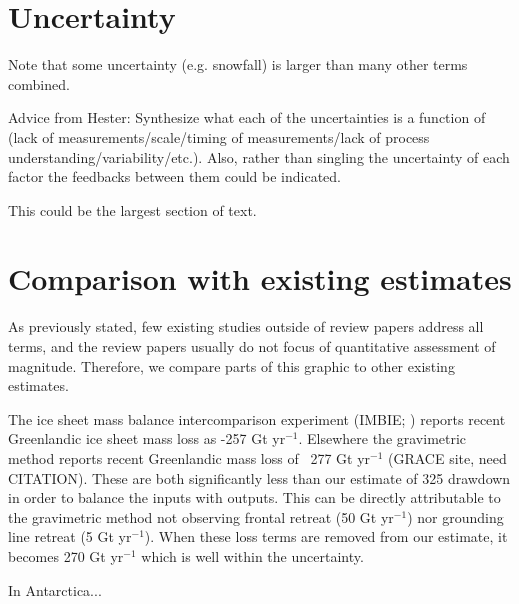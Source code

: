 \documentclass[jog]{igs}
\begin{document}
\section{Uncertainty}

Note that some uncertainty (e.g. snowfall) is larger than many other terms combined.

Advice from Hester: Synthesize what each of the uncertainties is a function of (lack of measurements/scale/timing of measurements/lack of process understanding/variability/etc.). Also, rather than singling the uncertainty of each factor the feedbacks between them could be indicated.

This could be the largest section of text.

\section{Comparison with existing estimates}

As previously stated, few existing studies outside of review papers address all terms, and the review papers usually do not focus of quantitative assessment of magnitude. Therefore, we compare parts of this graphic to other existing estimates.

The ice sheet mass balance intercomparison experiment (IMBIE; \citet{otosaka_2023}) reports recent Greenlandic ice sheet mass loss as -257  Gt yr$^{-1}$. Elsewhere the gravimetric method reports recent Greenlandic mass loss of ~277 Gt yr$^{-1}$ (GRACE site, need CITATION). These are both significantly less than our estimate of 325 drawdown in order to balance the inputs with outputs. This can be directly attributable to the gravimetric method not observing frontal retreat (50 Gt yr$^{-1}$) nor grounding line retreat (5 Gt yr$^{-1}$). When these loss terms are removed from our estimate, it becomes 270 Gt yr$^{-1}$ which is well within the uncertainty.

In Antarctica...



\end{document}
